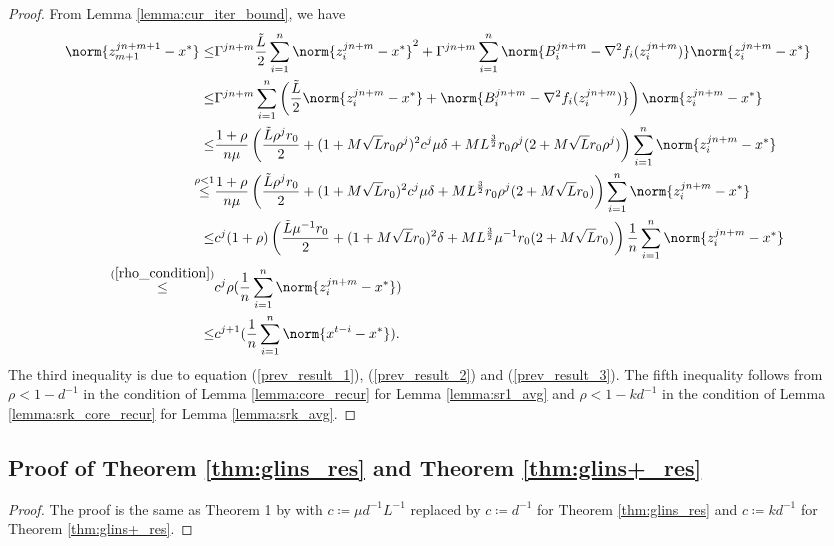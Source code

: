 \begin{proof}
    From Lemma \ref{lemma:cur_iter_bound}, we have
    \begin{align*}
        \norm{z_{m + 1}^{j n + m + 1} - x^*} \leq &\Gamma^{j n + m} \frac{\Tilde{L}}{2} \sum_{i = 1}^{n} \norm{z_i^{j n + m} - x^*}^2 + \Gamma^{j n + m} \sum_{i=1}^n \norm{B_i^{j n + m} - \nabla^2 f_i (z_i^{j n + m})} \norm{z_i^{j n + m} - x^*} \\
        \leq & \Gamma^{j n + m} \sum_{i = 1}^{n} \left(\frac{\Tilde{L}}{2}  \norm{z_i^{j n + m} - x^*} +  \norm{B_i^{j n + m} - \nabla^2 f_i (z_i^{j n + m})}\right) \norm{z_i^{j n + m} - x^*} \\
        \leq & \frac{1 + \rho}{n \mu}  \left(\frac{\Tilde{L} \rho^j r_0}{2}   + (1 + M \sqrt{L}r_0 \rho^j)^2 c^j \mu \delta + M L^{\frac{3}{2}} r_0 \rho^j (2 + M \sqrt{L} r_0 \rho^j) \right) \sum_{i = 1}^{n} \norm{z_i^{j n + m} - x^*} \\
        \overset{\rho < 1}{\leq} & \frac{1 + \rho}{n \mu}  \left(\frac{\Tilde{L} \rho^j r_0}{2}   + (1 + M \sqrt{L}r_0)^2 c^j \mu \delta + M L^{\frac{3}{2}} r_0 \rho^j (2 + M \sqrt{L} r_0 ) \right) \sum_{i = 1}^{n} \norm{z_i^{j n + m} - x^*} \\
         \leq & c^j (1 + \rho)  \left(\frac{\Tilde{L} \mu^{-1} r_0}{2}   + (1 + M \sqrt{L}r_0)^2  \delta + M L^{\frac{3}{2}} \mu^{-1} r_0  (2 + M \sqrt{L} r_0 ) \right) \frac{1}{n}\sum_{i = 1}^{n} \norm{z_i^{j n + m} - x^*} \\
         \overset{(\ref{rho_condition})}{\leq} & c^{j} \rho (\frac{1}{n} \sum_{i=1}^n \norm{z_i^{j n + m} - x^*}) \\
         \leq & c^{j + 1} (\frac{1}{n} \sum_{i=1}^n \norm{x^{t - i} - x^*}).
    \end{align*}
    The third inequality is due to equation (\ref{prev_result_1}), (\ref{prev_result_2}) and (\ref{prev_result_3}). The fifth inequality follows from $\rho < 1 - d^{-1}$ in the condition of Lemma \ref{lemma:core_recur} for Lemma \ref{lemma:sr1_avg} and $\rho < 1 - k d^{-1}$ in the condition of Lemma \ref{lemma:srk_core_recur} for Lemma \ref{lemma:srk_avg}.
\end{proof}

\subsection{Proof of Theorem \ref{thm:glins_res} and Theorem \ref{thm:glins+_res}}
\begin{proof}
    The proof is the same as Theorem 1 by \cite{lahoti2023sharpened} with $c \coloneqq \mu d^{-1} L^{-1}$ replaced by $c \coloneqq d^{-1}$ for Theorem \ref{thm:glins_res} and $c \coloneqq k d^{-1}$ for Theorem \ref{thm:glins+_res}.
\end{proof}


